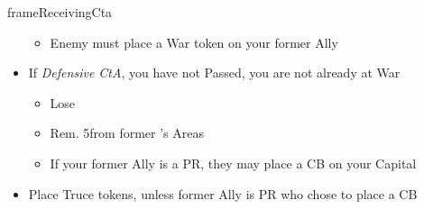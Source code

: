 \documentclass[10pt]{article}
\newlength{\fhDowRestrictions} \setlength\fhDowRestrictions{6\baselineskip}
\newlength{\frameDowRestrictionsY} \setlength\frameDowRestrictionsY{\calc{\textheight - \fhDowRestrictions}}
\newlength{\fhCasusBelli} \setlength\fhCasusBelli{12\baselineskip}
\newlength{\frameCasusBelliY} \setlength\frameCasusBelliY{\calc{\frameDowRestrictionsY - \fhCasusBelli - \frameToFrameSpacing}}
\newlength{\fhHreIntWars} \setlength\fhHreIntWars{4\baselineskip}
\newlength{\frameHreIntWarsY} \setlength\frameHreIntWarsY{\calc{\frameCasusBelliY - \fhHreIntWars - \frameToFrameSpacing}}
\newlength{\fhDefHre} \setlength\fhDefHre{14\baselineskip}
\newlength{\frameDefHreY} \setlength\frameDefHreY{\calc{\frameHreIntWarsY - \fhDefHre - \frameToFrameSpacing}}
\newlength{\fhReceivingCta} \setlength\fhReceivingCta{\calc{\frameDefHreY - \frameToFrameSpacing}}
\begin{document}
\begin{dynamiccontents*}{frameReceivingCta}
\begin{eubox}{\fhReceivingCta}
\begin{multicols}{2}
\begin{itemize}
\begin{itemize}
				\item Enemy must place a War token on your former Ally
			\end{itemize}
			\item If \emph{Defensive CtA},  you have not Passed,  you are not already at War
			\begin{itemize}
				\item Lose 
				\item Rem. 5\influence from former \ally's Areas
				\item If your former Ally is a PR, they may place a CB on your Capital
			\end{itemize}
			\item Place Truce tokens, unless former Ally is PR who chose to place a CB
		\end{itemize}
	\end{multicols}
\end{eubox}\end{dynamiccontents*}
\end{document}

